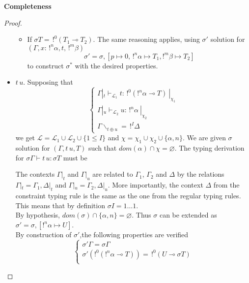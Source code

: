 \begin{prop}{\bf Completeness}
\begin{proof}
\begin{itemize}
\begin{itemize}
			\item If $\sigma T = \,!^0 (T_1 \multimap T_2)$.
				The same reasoning applies, using $\sigma'$ solution for $(\Gamma,x : \,!^n\alpha, t, \,!^m\beta)$
					$$\sigma' = \sigma, [p \mapsto 0, \,!^n\alpha \mapsto T_1, !^m\beta \mapsto T_2]$$
				to construct $\sigma^*$ with the desired properties.
			\end{itemize}
		
		\item $t \, u$. Supposing that
			$$\left\{ \begin{array}{l}
				\Gamma|_t \vdash_{\mathcal{L}_1} t : \,!^0(!^n\alpha \multimap T) ~|_{\chi_1} \\
				\Gamma|_u \vdash_{\mathcal{L}_2} u : \,!^n\alpha ~|_{\chi_2} \\
				\Gamma\backslash_{t \oplus u} = \,!^I\Delta
			\end{array} \right.$$
			we get $\mathcal{L} = \mathcal{L}_1 \cup \mathcal{L}_2 \cup \{ 1 \le I \}$ and
			$\chi = \chi_1 \cup \chi_2 \cup \{ \alpha, n\}$. We are given $\sigma$ solution for $(\Gamma, t \, u, T)$ such that
			$dom(\alpha) \cap \chi = \varnothing$.
			The typing derivation for $\sigma \Gamma \vdash t \, u : \sigma T$ must be
				\begin{prooftree}
				\end{prooftree}
			The contexts $\Gamma|_t$ and $\Gamma|_u$ are related to $\Gamma_1$, $\Gamma_2$ and $\Delta$ by the relations
			$\Gamma|_t = \Gamma_1, \Delta|_t$ and $\Gamma|_u = \Gamma_2, \Delta|_u$. More importantly, the context
			$\Delta$ from the constraint typing rule is the same as the one from the regular typing rules. This means
			that by definition $\sigma I = 1 \dots 1$. \\
			By hypothesis, $dom(\sigma) \cap \{ \alpha, n \} = \varnothing$. Thus $\sigma$ can be extended as
			$\sigma' = \sigma, [!^n\alpha \mapsto U]$. \\
			By construction of $\sigma'$,the following properties are verified
				$$\left\{ \begin{array}{l}
									   \sigma' \Gamma = \sigma \Gamma \\
									   \sigma'(!^0(!^n \alpha \multimap T)) = \,!^0 (U \multimap \sigma T) \\

\end{array}$$
\end{itemize}
\end{proof}
\end{prop}

